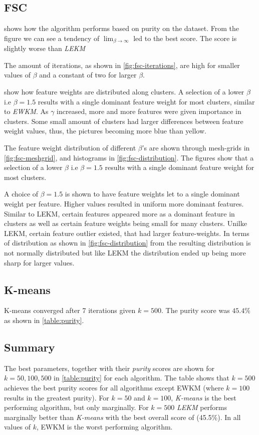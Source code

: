 \documentclass[../report.tex]{subfiles}
\begin{document}
\subsection{FSC}
 shows how the algorithm performs based on purity on the dataset. From the figure we can see a tendency of $\lim_{\beta \to{\infty}}$ led to the best score. The score is slightly worse than \textit{LEKM}

The amount of iterations, as shown in \cref{fig:fsc-iterations}, are high for smaller values of $\beta$ and a constant of two for larger $\beta$.

 show how feature weights are distributed along clusters. A selection of a lower $\beta$ i.e $\beta=1.5$ results with a single dominant feature weight for most clusters, similar to \textit{EWKM}. As $\gamma$ increased, more and more features were given importance in clusters. Some small amount of clusters had larger differences between feature weight values, thus, the pictures becoming more blue than yellow.

The feature weight distribution of different $\beta$'s are shown through mesh-grids in \cref{fig:fsc-meshgrid}, and histograms in \cref{fig:fsc-distribution}. The figures show that a selection of a lower $\beta$ i.e $\beta=1.5$ results with a single dominant feature weight for most clusters.

A choice of $\beta=1.5$ is shown to have feature weights let to a single dominant weight per feature. Higher values resulted in uniform more dominant features. Similar to LEKM, certain features appeared more as a dominant feature in clusters as well as certain feature weights being small for many clusters. Unilke LEKM, certain feature outlier existed, that had larger feature-weights. In terms of distribution as shown in \cref{fig:fsc-distribution} from the resulting distribution is not normally distributed but like LEKM the distribution ended up being more sharp for larger values.

\subsection{K-means}
K-means converged after 7 iterations given $k=500$. The purity score was $45.4\%$ as shown in \cref{table:purity}.

\subsection{Summary}
The best parameters, together with their \textit{purity} scores are shown for $k=50,100,500$ in \cref{table:purity} for each algorithm. The table shows that $k=500$ achieves the best purity scores for all algorithms except EWKM (where $k=100$ results in the greatest purity). For $k=50$ and $k=100$, \textit{K-means} is the best performing algorithm, but only marginally. For $k=500$ \textit{LEKM} performs marginally better than \textit{K-means} with the best overall score of (45.5\%). In all values of $k$, EWKM is the worst performing algorithm.
\end{document}
